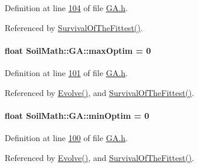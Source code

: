 Definition at line \hyperlink{_g_a_8h_source_l00104}{104} of file \hyperlink{_g_a_8h_source}{G\+A.\+h}.



Referenced by \hyperlink{_g_a_8cpp_source_l00189}{Survival\+Of\+The\+Fittest()}.

\hypertarget{class_soil_math_1_1_g_a_a99565a1789513769c2cf0e6971854ef6}{}
\paragraph[{max\+Optim}]{\setlength{\rightskip}{0pt plus 5cm}float Soil\+Math\+::\+G\+A\+::max\+Optim = 0\hspace{0.3cm}{\ttfamily [private]}}\label{class_soil_math_1_1_g_a_a99565a1789513769c2cf0e6971854ef6}


Definition at line \hyperlink{_g_a_8h_source_l00101}{101} of file \hyperlink{_g_a_8h_source}{G\+A.\+h}.



Referenced by \hyperlink{_g_a_8cpp_source_l00023}{Evolve()}, and \hyperlink{_g_a_8cpp_source_l00189}{Survival\+Of\+The\+Fittest()}.

\hypertarget{class_soil_math_1_1_g_a_af8fab109094e0730304ba1c462b4e2bf}{}
\paragraph[{min\+Optim}]{\setlength{\rightskip}{0pt plus 5cm}float Soil\+Math\+::\+G\+A\+::min\+Optim = 0\hspace{0.3cm}{\ttfamily [private]}}\label{class_soil_math_1_1_g_a_af8fab109094e0730304ba1c462b4e2bf}


Definition at line \hyperlink{_g_a_8h_source_l00100}{100} of file \hyperlink{_g_a_8h_source}{G\+A.\+h}.



Referenced by \hyperlink{_g_a_8cpp_source_l00023}{Evolve()}, and \hyperlink{_g_a_8cpp_source_l00189}{Survival\+Of\+The\+Fittest()}.

\hypertarget{class_soil_math_1_1_g_a_a82996d544a2f25b5a75ae8ba1e82d661}{}
